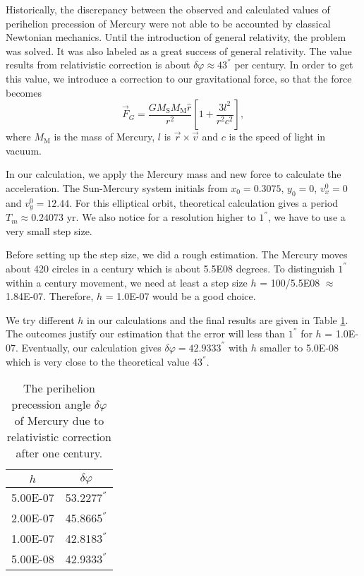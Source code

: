 Historically, the discrepancy between the observed and calculated values of perihelion precession of Mercury were not able to be accounted by classical Newtonian mechanics.
Until the introduction of general relativity, the problem was solved.
It was also labeled as a great success of general relativity.
The value results from relativistic correction is about $\delta \varphi\approx 43^{''}$ per century\cite{wiki:xxx}.
In order to get this value, we introduce a correction to our gravitational force, so that the force becomes
\begin{equation}
	\vec{F}_G = \frac{GM_{\mathrm{S}}M_{\mathrm{M}}\hat{r}}{r^2}\left[1+\frac{3l^2}{r^2c^2}\right],
\end{equation}
where $M_{\mathrm{M}}$ is the mass of Mercury, $l$ is $\vec{r}\times \vec{v}$ and $c$ is the speed of light in vacuum.

In our calculation, we apply the Mercury mass and new force to calculate the acceleration.
The Sun-Mercury system initials from $x_0=0.3075$, $y_0=0$, $v_{x}^0=0$ and $v_{y}^0=12.44$. 
For this elliptical orbit, theoretical calculation gives a period $T_m\approx 0.24073$ yr.
We also notice for a resolution higher to $1^{''}$, we have to use a very small step size.

Before setting up the step size, we did a rough estimation.
The Mercury moves about 420 circles in a century which is about 5.5E08 degrees. 
To distinguish $1^{''}$ within a century movement, we need at least a step size $h$ = 100/5.5E08 $\approx$ 1.84E-07. 
Therefore, $h$ = 1.0E-07 would be a good choice.

We try different $h$ in our calculations and the final results are given in Table \ref{tab::mercury}.
The outcomes justify our estimation that the error will less than $1^{''}$ for $h$ = 1.0E-07.
Eventually, our calculation gives $\delta \varphi=42.9333^{''}$ with $h$ smaller to 5.0E-08 which is very close to the theoretical value 43$^{''}$.
\begin{table}[tb]
	\centering
	\caption{The perihelion precession angle $\delta \varphi$ of Mercury due to relativistic correction after one century. }
	\label{my-label}
	\label{tab::mercury}
	\begin{tabular}{cc}
	\hline
	\hline
	$h$        & $\delta \varphi$     \\
	\hline
	5.00E-07 & 53.2277$^{''}$ \\
	2.00E-07 & 45.8665$^{''}$ \\
	1.00E-07 & 42.8183$^{''}$ \\
	5.00E-08 & 42.9333$^{''}$\\
	\hline
	\hline
	\end{tabular}
\end{table}